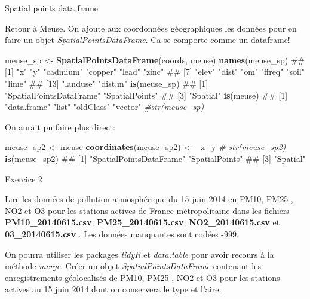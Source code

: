 \documentclass[8pt,ignorenonframetext,]{beamer}
\newenvironment{Shaded}{\begin{snugshade}}{\end{snugshade}}
\newcommand{\KeywordTok}[1]{\textcolor[rgb]{0.13,0.29,0.53}{\textbf{{#1}}}}
\newcommand{\StringTok}[1]{\textcolor[rgb]{0.31,0.60,0.02}{{#1}}}
\newcommand{\CommentTok}[1]{\textcolor[rgb]{0.56,0.35,0.01}{\textit{{#1}}}}
\newcommand{\ErrorTok}[1]{\textcolor[rgb]{0.64,0.00,0.00}{\textbf{{#1}}}}
\newcommand{\NormalTok}[1]{{#1}}
\begin{document}
\begin{frame}[fragile]{Spatial points data frame}

Retour à Meuse. On ajoute aux coordonnées géographiques les données pour
en faire un objet \emph{SpatialPointsDataFrame}. Ca se comporte comme un
dataframe!

\begin{Shaded}
\begin{Highlighting}[]
\NormalTok{meuse_sp <-}\StringTok{ }\KeywordTok{SpatialPointsDataFrame}\NormalTok{(coords, meuse)}
\KeywordTok{names}\NormalTok{(meuse_sp)}
\NormalTok{##  [1] "x"       "y"       "cadmium" "copper"  "lead"    "zinc"   }
\NormalTok{##  [7] "elev"    "dist"    "om"      "ffreq"   "soil"    "lime"   }
\NormalTok{## [13] "landuse" "dist.m"}
\KeywordTok{is}\NormalTok{(meuse_sp)}
\NormalTok{## [1] "SpatialPointsDataFrame" "SpatialPoints"         }
\NormalTok{## [3] "Spatial"}
\KeywordTok{is}\NormalTok{(meuse)}
\NormalTok{## [1] "data.frame" "list"       "oldClass"   "vector"}
\CommentTok{#str(meuse_sp)}
\end{Highlighting}
\end{Shaded}

On aurait pu faire plus direct:

\begin{Shaded}
\begin{Highlighting}[]
\NormalTok{meuse_sp2 <-}\StringTok{ }\NormalTok{meuse}
\KeywordTok{coordinates}\NormalTok{(meuse_sp2) <-}\StringTok{ }\ErrorTok{~}\NormalTok{x+y }
\CommentTok{# str(meuse_sp2)}
\KeywordTok{is}\NormalTok{(meuse_sp2)}
\NormalTok{## [1] "SpatialPointsDataFrame" "SpatialPoints"         }
\NormalTok{## [3] "Spatial"}
\end{Highlighting}
\end{Shaded}

\end{frame}

\begin{frame}{Exercice 2}

Lire les données de pollution atmosphérique du 15 juin 2014 en PM10,
PM25 , NO2 et O3 pour les stations actives de France métropolitaine dans
les fichiers \textbf{PM10\_20140615.csv}, \textbf{PM25\_20140615.csv},
\textbf{NO2\_20140615.csv} et \textbf{03\_20140615.csv} . Les données
manquantes sont codées -999.

On pourra utiliser les packages \emph{tidyR} et \emph{data.table} pour
avoir recours à la méthode \emph{merge}. Créer un objet
\emph{SpatialPointsDataFrame} contenant les enregistrements géolocalisés
de PM10, PM25 , NO2 et O3 pour les stations actives au 15 juin 2014 dont
on conservera le type et l'aire.

\end{frame}
\end{document}
